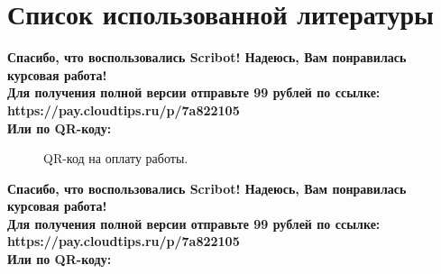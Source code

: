 \documentclass{article}
\begin{document}
\section{Список использованной литературы}
\begin{center}
    \textbf{
        Спасибо, что воспользовались Scribot! Надеюсь, Вам понравилась курсовая работа!\\
        Для получения полной версии отправьте 99 рублей по ссылке:\\
        https://pay.cloudtips.ru/p/7a822105\\
        Или по QR-коду:\\
    }
\end{center}
\begin{figure}[h]
    \caption{QR-код на оплату работы.}
    \label{ris:image}
\end{figure}
\newpage
\begin{center}
    \textbf{
        Спасибо, что воспользовались Scribot! Надеюсь, Вам понравилась курсовая работа!\\
        Для получения полной версии отправьте 99 рублей по ссылке:\\
        https://pay.cloudtips.ru/p/7a822105\\
        Или по QR-коду:\\
    }
\end{center}
\end{document}
